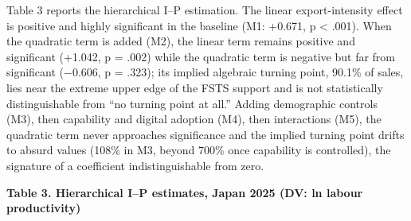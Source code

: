 \documentclass[
  12pt,a4paper]{article}
\begin{document}
Table 3 reports the hierarchical I--P estimation. The linear
export-intensity effect is positive and highly significant in the
baseline (M1: +0.671, p \textless{} .001). When the quadratic term is
added (M2), the linear term remains positive and significant (+1.042, p
= .002) while the quadratic term is negative but far from significant
(−0.606, p = .323); its implied algebraic turning point, 90.1\% of
sales, lies near the extreme upper edge of the FSTS support and is not
statistically distinguishable from ``no turning point at all.'' Adding
demographic controls (M3), then capability and digital adoption (M4),
then interactions (M5), the quadratic term never approaches significance
and the implied turning point drifts to absurd values (108\% in M3,
beyond 700\% once capability is controlled), the signature of a
coefficient indistinguishable from zero.

\textbf{Table 3. Hierarchical I--P estimates, Japan 2025 (DV: ln labour
productivity)}
\end{document}
